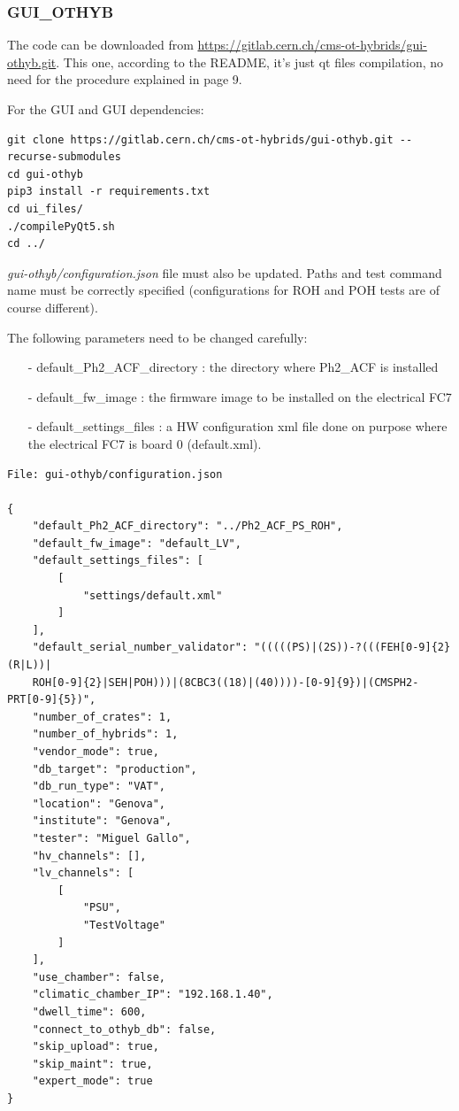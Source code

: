 \documentclass[10pt,a4paper]{article}
\begin{document}
\subsubsection{GUI\_OTHYB}
\label{gui}

The code can be downloaded from \url{https://gitlab.cern.ch/cms-ot-hybrids/gui-othyb.git}. This one, according to the README, it’s just qt files compilation, no need for the procedure explained in page 9.

For the GUI and GUI dependencies: 

\begin{framed}
\begin{verbatim}
git clone https://gitlab.cern.ch/cms-ot-hybrids/gui-othyb.git --recurse-submodules 
cd gui-othyb
pip3 install -r requirements.txt
cd ui_files/
./compilePyQt5.sh
cd ../

\end{verbatim}
\end{framed}

\emph{gui-othyb/configuration.json} file must also be updated. Paths and test command name must be correctly specified (configurations for ROH and POH tests are of course different).

The following parameters need to be changed carefully:
\begin{itemize}
\item[-] default\_Ph2\_ACF\_directory : the directory where Ph2\_ACF is installed
\item[-] default\_fw\_image : the firmware image to be installed on the electrical FC7
\item[-] default\_settings\_files : a HW configuration xml file done on purpose where the electrical FC7 is board 0 (default.xml). 
\end{itemize}

\begin{framed}
\begin{verbatim}
File: gui-othyb/configuration.json

{
    "default_Ph2_ACF_directory": "../Ph2_ACF_PS_ROH",
    "default_fw_image": "default_LV",
    "default_settings_files": [
        [
            "settings/default.xml"
        ]
    ],
    "default_serial_number_validator": "(((((PS)|(2S))-?(((FEH[0-9]{2}(R|L))|
    ROH[0-9]{2}|SEH|POH)))|(8CBC3((18)|(40))))-[0-9]{9})|(CMSPH2-PRT[0-9]{5})",
    "number_of_crates": 1,
    "number_of_hybrids": 1,
    "vendor_mode": true,
    "db_target": "production",
    "db_run_type": "VAT",
    "location": "Genova",
    "institute": "Genova",
    "tester": "Miguel Gallo",
    "hv_channels": [],
    "lv_channels": [
        [
            "PSU",
            "TestVoltage"
        ]
    ],
    "use_chamber": false,
    "climatic_chamber_IP": "192.168.1.40",
    "dwell_time": 600,
    "connect_to_othyb_db": false,
    "skip_upload": true,
    "skip_maint": true,
    "expert_mode": true
}

\end{verbatim}
\end{framed}
\end{document}
